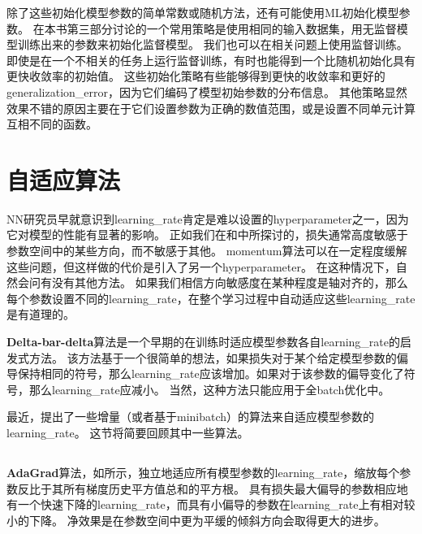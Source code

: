 除了这些初始化模型参数的简单常数或随机方法，还有可能使用\gls{ML}初始化模型参数。
在本书第三部分讨论的一个常用策略是使用相同的输入数据集，用无监督模型训练出来的参数来初始化监督模型。
我们也可以在相关问题上使用监督训练。
即使是在一个不相关的任务上运行监督训练，有时也能得到一个比随机初始化具有更快收敛率的初始值。
这些初始化策略有些能够得到更快的收敛率和更好的\gls{generalization_error}，因为它们编码了模型初始参数的分布信息。
其他策略显然效果不错的原因主要在于它们设置参数为正确的数值范围，或是设置不同单元计算互相不同的函数。


\section{自适应算法}
\label{sec:algorithms_with_adaptive_learning_rates}
\gls{NN}研究员早就意识到\gls{learning_rate}肯定是难以设置的\gls{hyperparameter}之一，因为它对模型的性能有显著的影响。
正如我们在和中所探讨的，损失通常高度敏感于参数空间中的某些方向，而不敏感于其他。
\gls{momentum}算法可以在一定程度缓解这些问题，但这样做的代价是引入了另一个\gls{hyperparameter}。
在这种情况下，自然会问有没有其他方法。
如果我们相信方向敏感度在某种程度是轴对齐的，那么每个参数设置不同的\gls{learning_rate}，在整个学习过程中自动适应这些\gls{learning_rate}是有道理的。



\textbf{Delta-bar-delta}算法\citep{jacobs1988}是一个早期的在训练时适应模型参数各自\gls{learning_rate}的启发式方法。
该方法基于一个很简单的想法，如果损失对于某个给定模型参数的偏导保持相同的符号，那么\gls{learning_rate}应该增加。如果对于该参数的偏导变化了符号，那么\gls{learning_rate}应减小。
当然，这种方法只能应用于全\gls{batch}优化中。


最近，提出了一些增量（或者基于\gls{minibatch}）的算法来自适应模型参数的\gls{learning_rate}。
这节将简要回顾其中一些算法。


\subsection{}
\label{sec:adagrad}
\textbf{AdaGrad}算法，如所示，独立地适应所有模型参数的\gls{learning_rate}，缩放每个参数反比于其所有梯度历史平方值总和的平方根\citep{Duchi+al-2011}。
具有损失最大偏导的参数相应地有一个快速下降的\gls{learning_rate}，而具有小偏导的参数在\gls{learning_rate}上有相对较小的下降。
净效果是在参数空间中更为平缓的倾斜方向会取得更大的进步。


